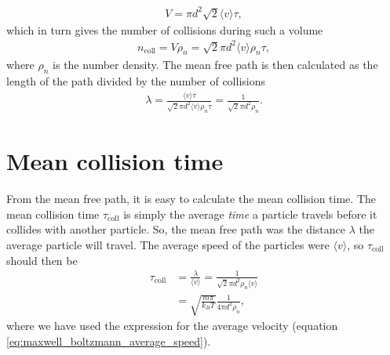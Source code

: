 \begin{align}
	V = \pi d^2\sqrt 2\langle v\rangle \tau,
\end{align}
which in turn gives the number of collisions during such a volume
\begin{align}
	\label{eq:num_collisions}
	n_\text{coll} = V\rho_n = \sqrt 2 \pi d^2\langle v\rangle \rho_n \tau,
\end{align}
where $\rho_n$ is the number density. The mean free path is then calculated as the length of the path divided by the number of collisions
\begin{align}
	\label{eq:mean_free_path}
	\lambda = \frac{\langle v\rangle \tau}{ \sqrt 2 \pi d^2\langle v\rangle \rho_n\tau} = \frac{1 }{ \sqrt 2 \pi d^2 \rho_n}.
\end{align}
\section{Mean collision time}
From the mean free path, it is easy to calculate the mean collision time. The mean collision time $\tau_\text{coll}$ is simply the average \textit{time} a particle travels before it collides with another particle. So, the mean free path was the distance $\lambda$ the average particle will travel. The average speed of the particles were $\langle v \rangle$, so $\tau_\text{coll}$ should then be
\begin{align}
	\label{eq:kinetic_theory_mean_collision_time}
	\tau_\text{coll} &= \frac{\lambda}{\langle v\rangle} = \frac{1}{\sqrt 2 \pi d^2 \rho_n \langle v \rangle}\\
	&= \sqrt{\frac{m\pi}{k_B T}}\frac{1}{4\pi d^2\rho_n},
\end{align}
where we have used the expression for the average velocity (equation \eqref{eq:maxwell_boltzmann_average_speed}). 
